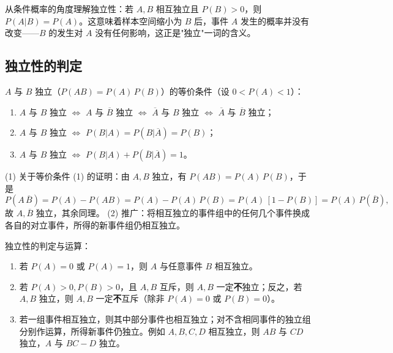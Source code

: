 \documentclass[lang=cn,11pt]{elegantbook}
\begin{document}
\begin{note}
从条件概率的角度理解独立性：若 \(A, B\) 相互独立且 \(P(B) > 0\)，则 \(P(A|B) = P(A)\)。这意味着样本空间缩小为 \(B\) 后，事件 \(A\) 发生的概率并没有改变——\(B\) 的发生对 \(A\) 没有任何影响，这正是"独立"一词的含义。
\end{note}

\subsection{独立性的判定}

\begin{property}\label{prop:independence-equiv}
\(A\) 与 \(B\) 独立（\(P(AB)=P(A)\,P(B)\)）的等价条件（设 \(0 < P(A) < 1\)）：
\begin{enumerate}
    \item \(A\) 与 \(B\) 独立 \(\Leftrightarrow\) \(A\) 与 \(\overline{B}\) 独立 \(\Leftrightarrow\) \(\overline{A}\) 与 \(B\) 独立 \(\Leftrightarrow\) \(\overline{A}\) 与 \(\overline{B}\) 独立；
    \item \(A\) 与 \(B\) 独立 \(\Leftrightarrow\) \(P(B|A) = P(B|\overline{A}) = P(B)\)；
    \item \(A\) 与 \(B\) 独立 \(\Leftrightarrow\) \(P(B|A) + P(\overline{B}|\overline{A}) = 1\)。
\end{enumerate}
\end{property}

\begin{remark}
(1) 关于等价条件 (1) 的证明：由 \(A, B\) 独立，有 \(P(AB)=P(A)\,P(B)\)，于是
\[
P(A\,\overline{B}) = P(A) - P(AB) = P(A) - P(A)\,P(B) = P(A)\,[1-P(B)] = P(A)\,P(\overline{B}),
\]
故 \(A, \overline{B}\) 独立，其余同理。\newline
(2) 推广：将相互独立的事件组中的任何几个事件换成各自的对立事件，所得的新事件组仍相互独立。
\end{remark}

\begin{property}\label{prop:independence-compute}
独立性的判定与运算：
\begin{enumerate}
    \item 若 \(P(A)=0\) 或 \(P(A)=1\)，则 \(A\) 与任意事件 \(B\) 相互独立。
    \item 若 \(P(A)>0, P(B)>0\)，且 \(A, B\) 互斥，则 \(A, B\) 一定\textbf{不}独立；反之，若 \(A, B\) 独立，则 \(A, B\) 一定\textbf{不}互斥（除非 \(P(A)=0\) 或 \(P(B)=0\)）。
    \item 若一组事件相互独立，则其中部分事件也相互独立；对不含相同事件的独立组分别作运算，所得新事件仍独立。例如 \(A, B, C, D\) 相互独立，则 \(AB\) 与 \(CD\) 独立，\(A\) 与 \(BC-D\) 独立。
\end{enumerate}
\end{property}
\end{document}

